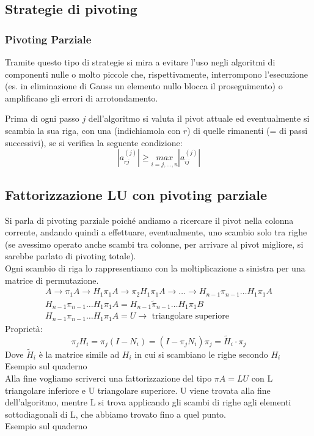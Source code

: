 \documentclass[12pt,a4paper,]{report}
\begin{document}
\begin{lezione}
    [Lezione 9 25/03]
\end{lezione}

\subsection{Strategie di pivoting}
\subsubsection{Pivoting Parziale}
Tramite questo tipo di strategie si mira a evitare l'uso negli algoritmi di componenti nulle o molto piccole che, rispettivamente, interrompono l'esecuzione (es. in eliminazione di Gauss un elemento nullo blocca il proseguimento) o amplificano gli errori di arrotondamento.\\
\begin{definizione}
    Prima di ogni passo $j$ dell'algoritmo si valuta il pivot attuale ed eventualmente si scambia la sua riga, con una (indichiamola con $r$) di quelle rimanenti (= di passi successivi), se si verifica la seguente condizione:
    \[
    |a^{(j)}_{rj}| \geq \underset{i = j,...,n}{max} |a^{(j)}_{ij}|
    \]
\end{definizione}
\subsection{Fattorizzazione LU con pivoting parziale}
Si parla di pivoting parziale poiché andiamo a ricercare il pivot nella colonna corrente, andando quindi a effettuare, eventualmente, uno scambio solo tra righe (se avessimo operato anche scambi tra colonne, per arrivare al pivot migliore, si sarebbe parlato di pivoting totale).\\
Ogni scambio di riga lo rappresentiamo con la moltiplicazione a sinistra per una matrice di permutazione.
\[
\begin{array}{c}
A \to \pi_1 A \to H_1\pi_1 A \to \pi_2 H_1\pi_1 A \to \ldots \to H_{n-1}\pi_{n-1} \ldots H_1\pi_1 A \\
H_{n-1}\pi_{n-1} \ldots H_1\pi_1 A = H_{n-1}\tilde{\pi}_{n-1} \ldots H_1\pi_1 B \\
H_{n-1}\pi_{n-1} \ldots H_1\pi_1 A = U \to \text{ triangolare superiore}
\end{array}
\]
Proprietà:
\[
\pi_j H_i = \pi_j(I - N_i) = (I - \pi_j N_i)\pi_j = \tilde{H}_i \cdot \pi_j
\]
Dove $\tilde{H}_i$ è la matrice simile ad $H_i$ in cui si scambiano le righe secondo $H_i$\\
Esempio sul quaderno\\
Alla fine vogliamo scriverci una fattorizzazione del tipo $\pi A = LU$ con L triangolare inferiore e U triangolare superiore. U viene trovata alla fine dell'algoritmo, mentre L si trova applicando gli scambi di righe agli elementi sottodiagonali di L, che abbiamo trovato fino a quel punto.\\
Esempio sul quaderno
\end{document}
